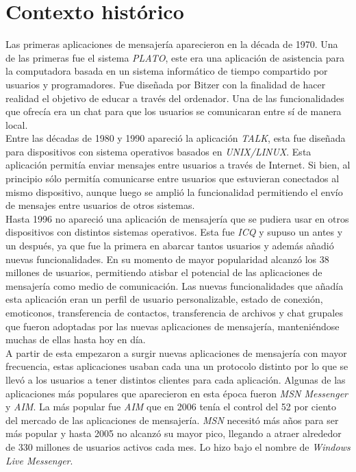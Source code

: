 \section{Contexto histórico}
Las primeras aplicaciones de mensajería aparecieron en la década de 1970. Una de las primeras fue el sistema \emph{PLATO}, este era una aplicación de asistencia para la computadora basada en un sistema informático de tiempo compartido por usuarios y programadores. Fue diseñada por Bitzer con la finalidad de hacer realidad el objetivo de educar a través del ordenador. Una de las funcionalidades que ofrecía era un chat para que los usuarios se comunicaran entre sí de manera local.\\ 
Entre las décadas de 1980 y 1990 apareció la aplicación \emph{TALK}, esta fue diseñada para dispositivos con sistema operativos basados en \emph{UNIX/LINUX}. Esta aplicación permitía enviar mensajes entre usuarios a través de Internet. Si bien, al principio sólo permitía comunicarse entre usuarios que estuvieran conectados al mismo dispositivo, aunque luego se amplió la funcionalidad permitiendo el envío de mensajes entre usuarios de otros sistemas.\\
Hasta 1996 no apareció una aplicación de mensajería que se pudiera usar en otros dispositivos con distintos sistemas operativos. 
Esta fue \emph{ICQ} y supuso un antes y un después, ya que fue la primera en abarcar tantos usuarios y además añadió nuevas funcionalidades. En su momento de mayor popularidad alcanzó los 38 millones de usuarios, permitiendo atisbar el potencial de las aplicaciones de mensajería como medio de comunicación.
Las nuevas funcionalidades que añadía esta aplicación eran un perfil de usuario personalizable, estado de conexión, emoticonos, transferencia de contactos, transferencia de archivos y chat grupales que fueron adoptadas por las nuevas aplicaciones de mensajería, manteniéndose muchas de ellas hasta hoy en día.\\
A partir de esta empezaron a surgir nuevas aplicaciones de mensajería con mayor frecuencia, estas aplicaciones usaban cada una un protocolo distinto por lo que se llevó a los usuarios a tener distintos clientes para cada aplicación.
Algunas de las aplicaciones más populares que aparecieron en esta época fueron \emph{MSN Messenger} y \emph{AIM}. La más popular fue \emph{AIM} que en 2006 tenía el control del 52 por ciento del mercado de las aplicaciones de mensajería. \emph{MSN} necesitó más años para ser más popular y hasta 2005 no alcanzó su mayor pico, llegando a atraer alrededor de 330 millones de usuarios activos cada mes. Lo hizo bajo el nombre de \emph{Windows Live Messenger}.\\ 

